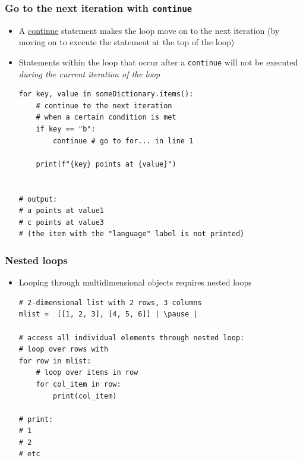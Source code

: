 \documentclass[xcolor=table]{beamer}
\begin{document}
\begin{frame}[fragile]
    \frametitle{Go to the next iteration with \texttt{continue}}
\begin{itemize}\addtolength{\itemsep}{0.5\baselineskip}
        \item A \href{https://docs.python.org/3/tutorial/controlflow.html?highlight=break#break-and-continue-statements-and-else-clauses-on-loops}{continue} statement makes the loop move on to the next iteration (by moving on to execute the statement at the top of the loop)
        \item Statements within the loop that occur after a \texttt{continue} will not be executed \emph{during the current iteration of the loop}
\begin{lstlisting}[style=python]
for key, value in someDictionary.items():
    # continue to the next iteration 
    # when a certain condition is met
    if key == "b":
        continue # go to for... in line 1

    print(f"{key} points at {value}")


# output:
# a points at value1
# c points at value3
# (the item with the "language" label is not printed)
\end{lstlisting}
    \end{itemize}
\end{frame}


\begin{frame}[fragile]
    \frametitle{Nested loops}
    \begin{itemize}
        \item Looping through multidimensional objects requires nested loops
\begin{lstlisting}[style=python]
# 2-dimensional list with 2 rows, 3 columns
mlist =  [[1, 2, 3], [4, 5, 6]] | \pause |

# access all individual elements through nested loop:
# loop over rows with
for row in mlist:
    # loop over items in row
    for col_item in row:
        print(col_item)

# print:
# 1
# 2
# etc
\end{lstlisting}
    \end{itemize}
\end{frame}

\end{document}
